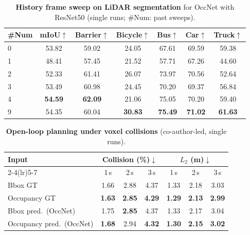 \begin{table}[t]
  \centering
  \caption[History frame sweep on LiDAR segmentation]{\textbf{History frame sweep on LiDAR segmentation} for OccNet with ResNet50 (single runs; \#Num: past sweeps).}
  \label{occnet:tab:frame_number_lidarseg}
  \footnotesize
  \begin{tabular}{lcccccc}
    \toprule
    \#Num & mIoU$\uparrow$ & Barrier$\uparrow$ & Bicycle$\uparrow$ & Bus$\uparrow$ & Car$\uparrow$ & Truck$\uparrow$ \\
    \midrule
    0 & 53.82 & 59.02 & 24.05 & 67.61 & 69.59 & 59.38 \\
    1 & 48.41 & 57.45 & 21.52 & 57.71 & 67.26 & 44.60 \\
    2 & 52.33 & 61.41 & 26.07 & 73.97 & 70.56 & 52.64 \\
    3 & 53.49 & 60.98 & 24.45 & 70.20 & 69.37 & 56.84 \\
    4 & \textbf{54.59} & \textbf{62.09} & 21.06 & 75.05 & 70.20 & 59.40 \\
    9 & 54.35 & 60.04 & \textbf{30.83} & \textbf{75.49} & \textbf{71.02} & \textbf{61.63} \\
    \bottomrule
  \end{tabular}
\end{table}

\begin{table}[t]
  \centering
  \caption[Open-loop planning under voxel collisions]{\textbf{Open-loop planning under voxel collisions} (co-author-led, single runs).}
  \label{occnet:tab:occupancy_metrics}
  \footnotesize
  \begin{tabular}{lcccccc}
    \toprule
    \multirow{2}{*}{Input} & \multicolumn{3}{c}{Collision (\%)$\downarrow$} & \multicolumn{3}{c}{$L_2$ (m)$\downarrow$} \\
    \cmidrule(lr){2-4}\cmidrule(lr){5-7}
     & 1\,s & 2\,s & 3\,s & 1\,s & 2\,s & 3\,s \\
    \midrule
    Bbox GT      & 1.66 & 2.88 & 4.37 & 1.33 & 2.18 & 3.03 \\
    Occupancy GT & \textbf{1.63} & \textbf{2.85} & \textbf{4.29} & \textbf{1.29} & \textbf{2.13} & \textbf{2.99} \\
    \midrule
    Bbox pred.\ (OccNet)      & 1.75 & \textbf{2.85} & 4.37 & 1.33 & 2.17 & 3.04 \\
    \rowcolor{perceive!10} Occupancy pred.\ (OccNet) & \textbf{1.68} & 2.94 & \textbf{4.32} & \textbf{1.30} & \textbf{2.15} & \textbf{3.02} \\
    \bottomrule
  \end{tabular}
\end{table}

